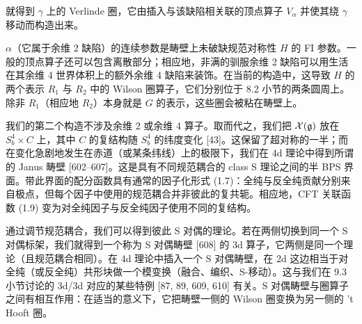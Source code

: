 
就得到 $\gamma$ 上的 Verlinde 圈，它由插入与该缺陷相关联的顶点算子 $V_\alpha$ 并使其绕 $\gamma$ 移动而构造出来。

$\alpha$（它属于余维 2 缺陷）的连续参数是畴壁上未破缺规范对称性 $H$ 的 FI 参数。一般的顶点算子还可以包含离散部分；相应地，非满的驯服余维 2 缺陷可以用生活在其余维 4 世界体积上的额外余维 4 缺陷来装饰。在当前的构造中，这导致 $H$ 的两个表示 $R_1$ 与 $R_2$ 中的 Wilson 圈算子，它们分别位于 8.2 小节的两条圆周上。除非 $R_1$（相应地 $R_2$）本身就是 $G$ 的表示，这些圈会被粘在畴壁上。

我们的第二个构造不涉及余维 2 或余维 4 算子。取而代之，我们把 $\mathcal{X}(\mathfrak{g})$ 放在 $S^4_b\times C$ 上，其中 $C$ 的复结构随 $S^4_b$ 的纬度变化 [43]。这保留了超对称的一半；而在变化急剧地发生在赤道（或某条纬线）上的极限下，我们在 4d 理论中得到所谓的 Janus 畴壁 [602--607]。这是具有不同规范耦合的 class S 理论之间的半 BPS 界面。带此界面的配分函数具有通常的因子化形式 (1.7)：全纯与反全纯贡献分别来自极点，但每个因子中使用的规范耦合并非彼此的复共轭。相应地，CFT 关联函数 (1.9) 变为对全纯因子与反全纯因子使用不同的复结构。

通过调节规范耦合，我们可以得到彼此 S 对偶的理论。若在两侧切换到同一个 S 对偶标架，我们就得到一个称为 S 对偶畴壁 [608] 的 3d 算子，它两侧是同一个理论（且规范耦合相同）。在 4d 理论中插入一个 S 对偶畴壁，在 2d 这边相当于对全纯（或反全纯）共形块做一个模变换（融合、编织、S-移动）。这与我们在 9.3 小节讨论的 3d/3d 对应的某些特例 [87, 89, 609, 610] 有关。S 对偶畴壁与圈算子之间有相互作用：在适当的意义下，它把畴壁一侧的 Wilson 圈变换为另一侧的 't Hooft 圈。

